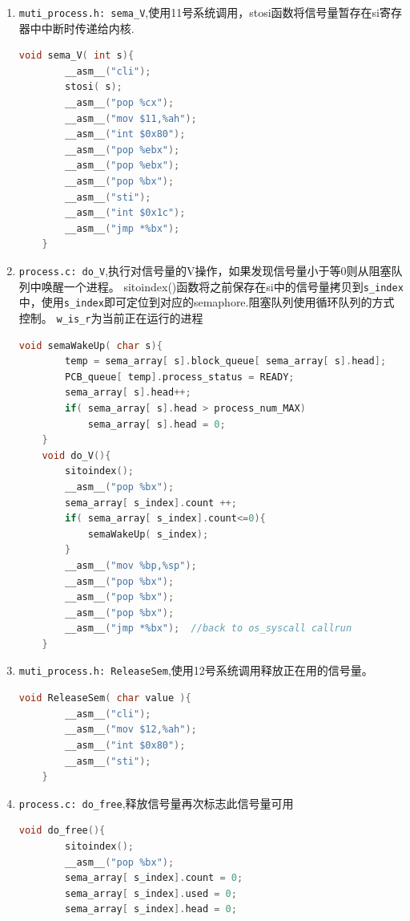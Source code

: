 \documentclass[a4paper]{article}
\begin{document}
{\begin{enumerate}
{\begin{lstlisting}[language={C}]
		sema_array[ s_index].count --;
		if( sema_array[ s_index].count<0){
			semaBlock( s_index);
		}

		__asm__("mov %bp,%sp");
		__asm__("pop %bx");
		__asm__("pop %bx");
		__asm__("pop %bx");
		__asm__("jmp *%bx");  //back to os_syscall callrun
	}
 	\end{lstlisting}}
	\item \verb|muti_process.h: sema_V|,使用11号系统调用，stosi函数将信号量暂存在si寄存器中中断时传递给内核.
	{\scriptsize\begin{lstlisting}[language={C}]
	void sema_V( int s){
		__asm__("cli");
		stosi( s);
		__asm__("pop %cx");
		__asm__("mov $11,%ah");
		__asm__("int $0x80");
		__asm__("pop %ebx");
		__asm__("pop %ebx");
		__asm__("pop %bx");
		__asm__("sti");
		__asm__("int $0x1c");
		__asm__("jmp *%bx");
	}
 	\end{lstlisting}}
	\item \verb|process.c: do_V|,执行对信号量的V操作，如果发现信号量小于等0则从阻塞队列中唤醒一个进程。
	sitoindex()函数将之前保存在si中的信号量拷贝到\verb|s_index|中，使用\verb|s_index|即可定位到对应的semaphore.阻塞队列使用循环队列的方式控制。
	\verb|w_is_r|为当前正在运行的进程
	{\scriptsize\begin{lstlisting}[language={C}]
	void semaWakeUp( char s){
		temp = sema_array[ s].block_queue[ sema_array[ s].head];
		PCB_queue[ temp].process_status = READY;
		sema_array[ s].head++;
		if( sema_array[ s].head > process_num_MAX)
			sema_array[ s].head = 0;
	}
	void do_V(){
		sitoindex();
		__asm__("pop %bx");
		sema_array[ s_index].count ++;
		if( sema_array[ s_index].count<=0){
			semaWakeUp( s_index);
		}
		__asm__("mov %bp,%sp");
		__asm__("pop %bx");
		__asm__("pop %bx");
		__asm__("pop %bx");
		__asm__("jmp *%bx");  //back to os_syscall callrun
	}
 	\end{lstlisting}}
	\item \verb|muti_process.h: ReleaseSem|,使用12号系统调用释放正在用的信号量。
	{\scriptsize\begin{lstlisting}[language={C}]
	void ReleaseSem( char value ){
		__asm__("cli");
		__asm__("mov $12,%ah");
		__asm__("int $0x80");
		__asm__("sti");
	}
 	\end{lstlisting}}
	\item \verb|process.c: do_free|,释放信号量再次标志此信号量可用
	{\scriptsize\begin{lstlisting}[language={C}]
	void do_free(){
		sitoindex();
		__asm__("pop %bx");
		sema_array[ s_index].count = 0;
		sema_array[ s_index].used = 0;
		sema_array[ s_index].head = 0;

\end{lstlisting}}
\end{enumerate}}
\end{document}
